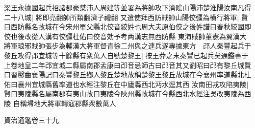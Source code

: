 梁王永據國起兵招諸郡豪桀沛人周建等並署為將帥攻下濟隂山陽沛楚淮陽汝南凡得二十八城|{
	將即亮翻帥所類翻濟子禮翻}
又遣使拜西防賊帥山陽佼彊為横行將軍|{
	賢曰西防縣名故城在今宋州單父縣北佼音絞姓也周大夫原伯佼之後姓譜曰春秋絞國即佼也後改從人漢有佼彊杜佑曰佼音効予考两漢志無西防縣}
東海賊帥董憲為翼漢大將軍琅邪賊帥張步為輔漢大將軍督青徐二州與之連兵遂專據東方　邔人秦豐起兵于黎丘攻得邔宜城等十餘縣有衆萬人自號楚黎王|{
	按王莽之末秦豐已起兵矣通鑑書于上卷地皇二年邔宜城二縣屬南郡孟康曰邔音忌師古曰邔音其又劉昭曰邔有黎丘城賢曰習鑿齒襄陽記曰秦豐黎丘鄉人黎丘楚地故稱楚黎王黎丘故城在今襄州率道縣北杜佑曰襄州宜城縣舊率道也水經注黎丘在中廬縣西北沔水逕其西}
汝南田戎攻陷夷陵|{
	賢曰夷陵縣名屬南郡有夷山故曰夷陵今陜州縣故城在今縣西北水經注吳改夷陵為西陵}
自稱埽地大將軍轉寇郡縣衆數萬人

資治通鑑卷三十九




















































































